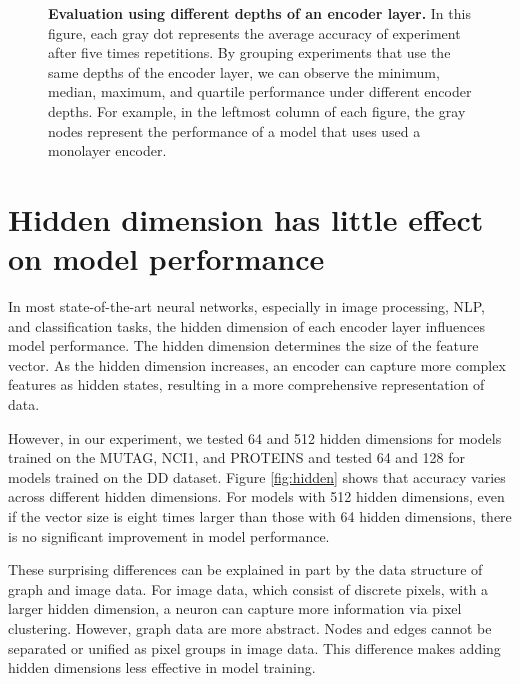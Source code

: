 \begin{figure}[htbp]
\vspace{0.5cm}
\caption[Evaluation using different depths of an encoder layer]{\textbf{Evaluation using different depths of an encoder layer.} In this figure, each gray dot represents the average accuracy of experiment after five times repetitions. By grouping experiments that use the same depths of the encoder layer, we can observe the minimum, median, maximum, and quartile performance under different encoder depths. For example, in the leftmost column of each figure, the gray nodes represent the performance of a model that uses used a monolayer encoder.}\label{fig:deeper}
\end{figure}




\section{Hidden dimension has little effect on model performance}

In most state-of-the-art neural networks, especially in image processing, NLP, and classification tasks, the hidden dimension of each encoder layer influences model performance. The hidden dimension determines the size of the feature vector. As the hidden dimension increases, an encoder can capture more complex features as hidden states, resulting in a more comprehensive representation of data.

However, in our experiment, we tested 64 and 512 hidden dimensions for models trained on the MUTAG, NCI1, and PROTEINS and tested 64 and 128 for models trained on the DD dataset. Figure \ref{fig:hidden} shows that accuracy varies across different hidden dimensions. For models with 512 hidden dimensions, even if the vector size is eight times larger than those with 64 hidden dimensions, there is no significant improvement in model performance. 

These surprising differences can be explained in part by the data structure of graph and image data. For image data, which consist of discrete pixels, with a larger hidden dimension, a neuron can capture more information via pixel clustering. However, graph data are more abstract. Nodes and edges cannot be separated or unified as pixel groups in image data. This difference makes adding hidden dimensions less effective in model training. 

